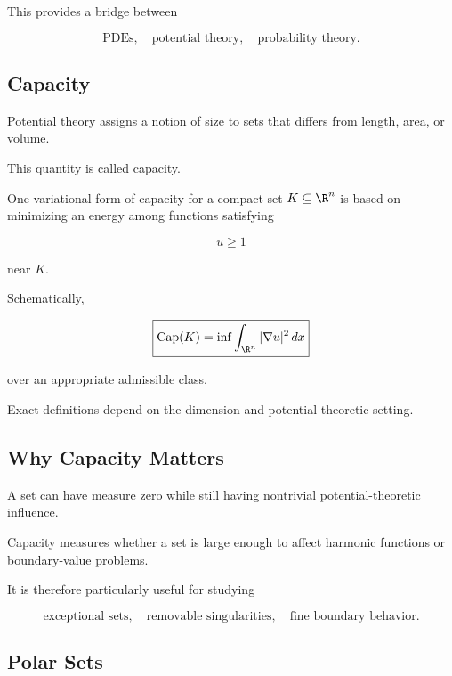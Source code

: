 This provides a bridge between

\[
\boxed{
\text{PDEs},
\quad
\text{potential theory},
\quad
\text{probability theory}.
}
\]

\subsection{Capacity}
\label{subsec:potential-capacity}

Potential theory assigns a notion of size to sets that differs from
length, area, or volume.

This quantity is called capacity.

One variational form of capacity for a compact set \(K\subseteq\R^n\)
is based on minimizing an energy among functions satisfying

\[
u\geq1
\]

near \(K\).

Schematically,

\[
\boxed{
\operatorname{Cap}(K)
=
\inf
\int_{\R^n}
|\nabla u|^2\,dx
}
\]

over an appropriate admissible class.

Exact definitions depend on the dimension and potential-theoretic
setting.

\subsection{Why Capacity Matters}
\label{subsec:why-capacity-matters}

A set can have measure zero while still having nontrivial
potential-theoretic influence.

Capacity measures whether a set is large enough to affect harmonic
functions or boundary-value problems.

It is therefore particularly useful for studying

\[
\boxed{
\text{exceptional sets},
\quad
\text{removable singularities},
\quad
\text{fine boundary behavior}.
}
\]

\subsection{Polar Sets}
\label{subsec:polar-sets}

